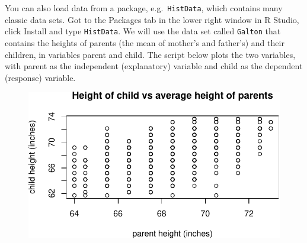 \documentclass[
  letterpaper,
  DIV=11,
  numbers=noendperiod]{scrreprt}
\newenvironment{Shaded}{\begin{snugshade}}{\end{snugshade}}
\newcommand{\AttributeTok}[1]{\textcolor[rgb]{0.40,0.45,0.13}{#1}}
\newcommand{\FunctionTok}[1]{\textcolor[rgb]{0.28,0.35,0.67}{#1}}
\newcommand{\NormalTok}[1]{\textcolor[rgb]{0.00,0.23,0.31}{#1}}
\newcommand{\SpecialCharTok}[1]{\textcolor[rgb]{0.37,0.37,0.37}{#1}}
\newcommand{\StringTok}[1]{\textcolor[rgb]{0.13,0.47,0.30}{#1}}
\begin{document}
You can also load data from a package, e.g.~\texttt{HistData}, which
contains many classic data sets. Got to the Packages tab in the lower
right window in R Studio, click Install and type \texttt{HistData}. We
will use the data set called \texttt{Galton} that contains the heights
of parents (the mean of mother's and father's) and their children, in
variables parent and child. The script below plots the two variables,
with parent as the independent (explanatory) variable and child as the
dependent (response) variable.

\begin{Shaded}
\end{Shaded}

\begin{figure}[H]

{\centering \includegraphics{./descriptive_files/figure-pdf/unnamed-chunk-2-1.pdf}

}

\end{figure}

\begin{Shaded}
\end{Shaded}
\end{document}
